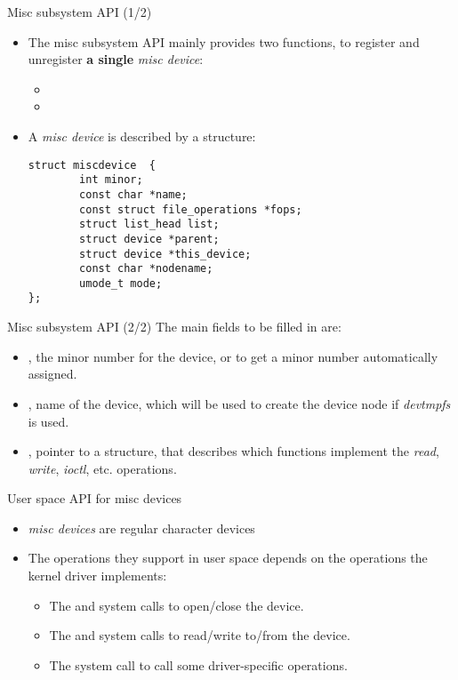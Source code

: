 \begin{frame}[fragile]{Misc subsystem API (1/2)}
  \begin{itemize}
  \item The misc subsystem API mainly provides two functions, to
    register and unregister {\bf a single} {\em misc device}:
    \begin{itemize}
    \item {}
    \item {}
    \end{itemize}
  \item A {\em misc device} is described by a 
    structure:
    \begin{verbatim}
struct miscdevice  {
        int minor;
        const char *name;
        const struct file_operations *fops;
        struct list_head list;
        struct device *parent;
        struct device *this_device;
        const char *nodename;
        umode_t mode;
};
\end{verbatim}
  \end{itemize}
\end{frame}

\begin{frame}[fragile]{Misc subsystem API (2/2)}
  The main fields to be filled in  are:
  \begin{itemize}
  \item {}, the minor number for the device, or
     to get a minor number automatically
    assigned.
  \item {}, name of the device, which will be used to create
    the device node if {\em devtmpfs} is used.
  \item {}, pointer to a  structure, that
    describes which functions implement the {\em read}, {\em write},
    {\em ioctl}, etc. operations.
  \end{itemize}
\end{frame}

\begin{frame}{User space API for misc devices}
  \begin{itemize}
  \item {\em misc devices} are regular character devices
  \item The operations they support in user space depends on the
    operations the kernel driver implements:
    \begin{itemize}
    \item The  and  system calls to
      open/close the device.
    \item The  and  system calls to
      read/write to/from the device.
    \item The  system call to call some driver-specific
      operations.
    \end{itemize}
  \end{itemize}
\end{frame}

